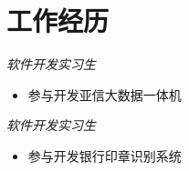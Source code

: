 \section{工作经历}
\textit{软件开发实习生}
\begin{itemize}
  \item 参与开发亚信大数据一体机
\end{itemize}

\textit{软件开发实习生}
\begin{itemize}
  \item 参与开发银行印章识别系统
\end{itemize}
